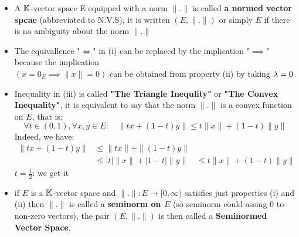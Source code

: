 	\begin{remark}[]
		\begin{itemize}
			\item A $\mathbb{K}$-vector space E equipped with a norm $\| . \| $ is called \textbf{a normed vector spcae}
				(abbreviated to N.V.S), it is written $(E,\| . \| ) $ or simply $E$ if there is no ambiguity
				about the norm $\| . \|$
			\item   The equivallence "$\iff$" in (i) can be replaced by the implication "$\implies$" because the implication
				\\ $(x = 0_{E} \implies \| x \| = 0) $ can be obtained from property (ii) by taking $\lambda = 0$
			\item Inequality in (iii) is called \textbf{"The Triangle Inequlity"} or \textbf{"The Convex Inequality"},
				it is equivalent to say that the norm $\| . \|$ is a convex function on $E$, that is:
				\[
					\forall t \in (0,1) ,\forall x,y \in E: \quad \| tx + (1-t)y  \| \leq t\| x \| + (1-t)\| y \|  
				\]
				Indeed, we have:
				\begin{align*}
					\| tx + (1-t)y  \| & \leq \|t x \| + \|(1-t) y \| \\
							   & \leq \left| t \right| \| x \| + \left| 1-t \right|\| y \|
							   & \leq t \| x \| + (1-t) \| y \|  	
				\end{align*}
				$t = \frac{1}{2}$: we get it
			\item if $E$ is a $\mathbb{K}$-vector space and $ \| . \|  : E \longrightarrow [0, \infty) $ satisfies just properties
				(i) and (ii) then $\| . \| $ is called a \textbf{seminorm on $E$} (so seminorm could assing 0 to non-zero
				vectors), the pair $(E,\| . \| )$ is then called a \textbf{Seminormed Vector Space}.
		\end{itemize}
	\end{remark}           

